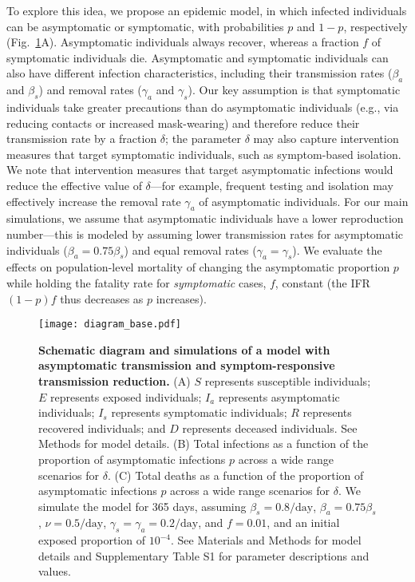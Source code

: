 \documentclass[12pt]{article}
\newcommand{\fref}[1]{Fig.~\ref{fig:#1}}
\begin{document}
To explore this idea, we propose an epidemic model,
in which infected individuals can be asymptomatic or symptomatic, with probabilities $p$ and $1-p$, respectively (\fref{base}A).  
Asymptomatic individuals always recover, whereas a fraction $f$ of symptomatic individuals die.
Asymptomatic and symptomatic individuals can also have different infection characteristics, including their transmission rates ($\beta_a$ and $\beta_s$) and removal rates ($\gamma_a$ and $\gamma_s$).
Our key assumption is that symptomatic individuals take greater precautions than do asymptomatic individuals (e.g., via reducing contacts or increased mask-wearing) and therefore reduce their transmission rate by a fraction $\delta$;
the parameter $\delta$ may also capture intervention measures that target symptomatic individuals, such as symptom-based isolation. 
We note that intervention measures that target asymptomatic infections would reduce the effective value of $\delta$---for example, frequent testing and isolation may effectively increase the removal rate $\gamma_a$ of asymptomatic individuals.
For our main simulations, we assume that asymptomatic individuals have a lower reproduction number---this is modeled by assuming lower transmission rates for asymptomatic individuals ($\beta_a = 0.75 \beta_s$) and equal removal rates ($\gamma_a = \gamma_s$).
We evaluate the effects on population-level mortality of changing the asymptomatic proportion $p$ while holding the fatality rate for \emph{symptomatic} cases, $f$, constant (the IFR $(1-p)f$ thus decreases as $p$ increases).
\begin{figure}[!ht]
\texttt{[image: diagram\_base.pdf]}
\caption{
\textbf{Schematic diagram and simulations of a model with asymptomatic transmission and symptom-responsive transmission reduction.}
(A) $S$ represents susceptible individuals; $E$ represents exposed individuals; $I_a$ represents asymptomatic individuals; $I_s$ represents symptomatic individuals; $R$ represents recovered individuals; and $D$ represents deceased individuals. See Methods for model details.
(B) Total infections as a function of the proportion of asymptomatic infections $p$ across a wide range scenarios for $\delta$.
(C) Total deaths as a function of the proportion of asymptomatic infections $p$ across a wide range scenarios for $\delta$.
We simulate the model for 365 days, assuming $\beta_s = 0.8/\mathrm{day}$, $\beta_a = 0.75 \beta_s$, $\nu=0.5/\mathrm{day}$, $\gamma_s=\gamma_a=0.2/\mathrm{day}$, and $f=0.01$, and an initial exposed proportion of $10^{-4}$.
See Materials and Methods for model details and Supplementary Table S1 for parameter descriptions and values.
}
\label{fig:base}
\end{figure}
\end{document}
